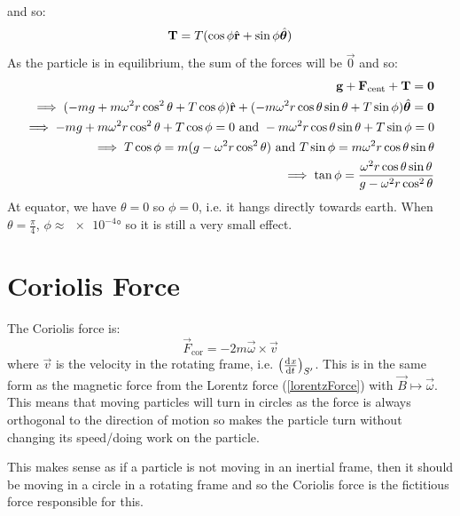 \documentclass[../main.tex]{subfiles}
\begin{document}
\begin{example}
\begin{center}
  \end{center}
  and so:
  \[
    \mathbf{\bm{T}} = T(\cos \phi \hat{\mathbf{\bm{r}}} + \sin \phi \hat{\mathbf{\bm{\theta}}})
  \]
  As the particle is in equilibrium, the sum of the forces will be $\vec{0}$ and so:
  \begin{align*}
    \mathbf{\bm{g}} + \mathbf{\bm{F}}_{\text{cent}} + \mathbf{\bm{T}} = \mathbf{\bm{0}}& \\
    \implies (-mg + m\omega^2 r \cos^2 \theta + T \cos \phi)\hat{\mathbf{\bm{r}}} + (-m\omega^2 r \cos \theta \sin \theta + T\sin \phi) \hat{\mathbf{\bm{\theta}}} = \mathbf{\bm{0}}& \\
    \implies -mg + m \omega^2 r \cos^2 \theta + T \cos \phi = 0 \text{ and } -m\omega^2 r \cos \theta \sin \theta + T\sin \phi = 0& \\
    \implies T\cos \phi = m(g - \omega^2 r \cos^2 \theta) \text{ and } T \sin \phi = m\omega^2 r \cos \theta \sin \theta \\
    \implies \tan \phi = \frac{\omega^2 r \cos \theta \sin \theta}{g - \omega^2 r \cos^2 \theta}&
  \end{align*}
  At equator, we have $\theta = 0$ so $\phi = 0$, i.e. it hangs directly towards earth.
  When $\theta = \frac{\pi}{4}$, $\phi \approx \ang{e-4}$ so it is still a very small effect.
\end{example}
\section{Coriolis Force}
The Coriolis force is:
\[
  \vec{F}_{\text{cor}} = -2 m \vec{\omega} \times \vec{v}
\]
where $\vec{v}$ is the velocity in the rotating frame, i.e. $\left(\deriv{x}{t}\right)_{S'}$.
This is in the same form as the magnetic force from the Lorentz force (\cref{lorentzForce}) with $\vec{B} \mapsto \vec{\omega}$.
This means that moving particles will turn in circles as the force is always orthogonal to the direction of motion so makes the particle turn without changing its speed/doing work on the particle.

This makes sense as if a particle is not moving in an inertial frame, then it should be moving in a circle in a rotating frame and so the Coriolis force is the fictitious force responsible for this.
\end{document}
